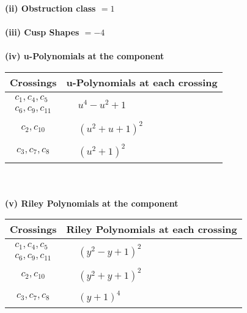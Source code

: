 \documentclass[1p]{elsarticle_modified}
\theoremstyle{definition}
\begin{document}
\flushleft \textbf{(ii) Obstruction class $= 1$}\\~\\
\flushleft \textbf{(iii) Cusp Shapes $= -4$}\\~\\
\newpage\renewcommand{\arraystretch}{1}
\flushleft \textbf{(iv) u-Polynomials at the component}\newline \\
\begin{tabular}{m{50pt}|m{274pt}}
Crossings & \hspace{64pt}u-Polynomials at each crossing \\
\hline $$\begin{aligned}c_{1},c_{4},c_{5}\\c_{6},c_{9},c_{11}\end{aligned}$$&$\begin{aligned}
&u^4- u^2+1
\end{aligned}$\\
\hline $$\begin{aligned}c_{2},c_{10}\end{aligned}$$&$\begin{aligned}
&(u^2+u+1)^2
\end{aligned}$\\
\hline $$\begin{aligned}c_{3},c_{7},c_{8}\end{aligned}$$&$\begin{aligned}
&(u^2+1)^2
\end{aligned}$\\
\hline
\end{tabular}\\~\\
\newpage\renewcommand{\arraystretch}{1}
\flushleft \textbf{(v) Riley Polynomials at the component}\newline \\
\begin{tabular}{m{50pt}|m{274pt}}
Crossings & \hspace{64pt}Riley Polynomials at each crossing \\
\hline $$\begin{aligned}c_{1},c_{4},c_{5}\\c_{6},c_{9},c_{11}\end{aligned}$$&$\begin{aligned}
&(y^2- y+1)^2
\end{aligned}$\\
\hline $$\begin{aligned}c_{2},c_{10}\end{aligned}$$&$\begin{aligned}
&(y^2+y+1)^2
\end{aligned}$\\
\hline $$\begin{aligned}c_{3},c_{7},c_{8}\end{aligned}$$&$\begin{aligned}
&(y+1)^4
\end{aligned}$\\
\hline
\end{tabular}\\~\\
\end{document}
